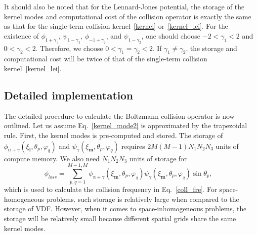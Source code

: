 It should also be noted that for the Lennard-Jones potential, the storage of the kernel modes and computational cost of the collision operator is exactly the same as that for the single-term collision kernel~\eqref{kernel} or~\eqref{kernel_lei}. 
For the existence of $\phi_{1+\gamma_1}$, $\psi_{1-\gamma_1}$, $\phi_{-1+\gamma_2}$, and $\psi_{1-\gamma_2}$, one should choose $-2<\gamma_1<2$ and $0<\gamma_2<2$. Therefore, we choose $0<\gamma_1=\gamma_2<2$. If $\gamma_1\neq\gamma_2$, the storage and computational cost will be twice of that of the single-term collision kernel~\eqref{kernel_lei}.


\subsection{Detailed implementation}

The detailed procedure to calculate the Boltzmann collision operator is now outlined. Let us assume Eq.~\eqref{kernel_mode2} is approximated by the trapezoidal rule. First, the kernel modes is pre-computed and stored. The storage of $\phi_{\alpha+\gamma}(\xi_{\bm{l}},\theta_p,\varphi_q)$ and $\psi_{\gamma}(\xi_{\bm{m}},\theta_p,\varphi_q)$ requires $2M(M-1)N_1N_2N_3$ units of compute memory. We also need $N_1N_2N_3$ units of storage for
\begin{equation}\label{phi_loss}
\phi_{loss}=\sum_{p,q=1}^{M-1,M}\phi_{\alpha+\gamma}(\xi_{\bm{m}},\theta_p,\varphi_q)
    \psi_{\gamma}(\xi_{\bm{m}},\theta_p,\varphi_q)\sin\theta_p,
\end{equation}
which is used to calculate the collision frequency in Eq.~\eqref{coll_fre}. For space-homogeneous problems, such storage is relatively large when compared to the storage of VDF. However, when it comes to space-inhomogeneous problems, the storage will be relatively small because different spatial grids share the same kernel modes. 


